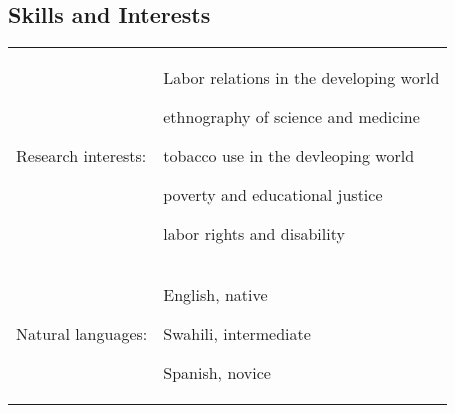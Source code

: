 \subsection{Skills and Interests}
\tabulinesep =0.9mm
\baselineskip
\begin{longtabu} to \linewidth{X[3]X[10]}
	Research interests: &
		\begin{itemize*}[itemjoin={{;\ }}, label=, afterlabel=,]
			\item Labor relations in the developing world
			\item ethnography of science and medicine
			\item tobacco use in the devleoping world
			\item poverty and educational justice
			\item labor rights and disability
		\end{itemize*}\\
	Natural languages: &
		\begin{itemize*}[itemjoin={{;\ }}, label=, afterlabel=,]
			\item English, native
			\item Swahili, intermediate
			\item Spanish, novice
		\end{itemize*}\\

\end{longtabu}
